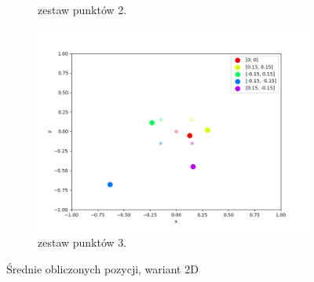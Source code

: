 \begin{figure}[h]
\begin{subfigure}{.5\textwidth}
\caption{zestaw punktów 2.}
\label{pic:2d_2_mult}
\end{subfigure}
\begin{subfigure}{.5\textwidth}
    \centering
    \includegraphics[width=\linewidth]{pics/mult_lat_2d/positions_3_mean.png}
\caption{zestaw punktów 3.}
\label{pic:2d_3_mult}
\end{subfigure}
\caption{Średnie obliczonych pozycji, wariant 2D}
\label{pic:2d_mult}
\end{figure}

